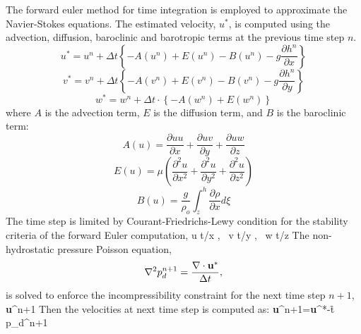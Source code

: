 The forward euler method for time integration is employed to
approximate the Navier-Stokes equations. The estimated velocity, $u^{*}$,
is computed using the advection, diffusion, baroclinic and barotropic terms at the previous time step $n$.
\begin {equation}
u^{*} = u^{n}+ \Delta t  \left\{
-A(u^n)+E(u^n)-B(u^n)-g\frac{\partial h^n}{\partial
x}%
\right\}
\end{equation}
\begin {equation}
v^{*} = v^{n}+ \Delta t  \left\{
-A(v^n)+E(v^n)-B(v^n)-g\frac{\partial h^n}{\partial
y}%
\right\}
\end{equation}
\begin {equation}
w^{*} = w^{n}+ \Delta t \cdot \left\{ -A(w^n)+E(w^n)\right\}
\end{equation}
where $A$ is the advection term, $E$ is the diffusion term, and $B$ is
the baroclinic term:
\begin{equation}
A(u)=\frac {\partial uu}{\partial x}+ \frac {\partial
uv}{\partial y}+ \frac {\partial uw}{\partial z}
\end{equation}
\begin{equation}
E(u)=\mu (\frac {\partial^2 u}{\partial x^2}+\frac
{\partial^2 u}{\partial y^2}+\frac {\partial^2 u}{\partial z^2})
\end{equation}
\begin{equation}
B(u)=\frac{g}{\rho_o}\int_z^h \frac{\partial \rho}{\partial x} d
\xi
\end{equation}
The time step is limited by Courant-Friedrichs-Lewy condition for the stability criteria of the forward Euler computation,
\be
u \Delta t/\Delta x , \ v \Delta t/\Delta y , \ w \Delta t/\Delta z 
\ee
The non-hydrostatic pressure Poisson equation,
\begin{equation}
\nabla^2 p_d^{n+1} = \frac {\nabla \cdot
\textbf{\textbf{u}}^*}{\Delta t},
\label{eqn:pressure-poisson-const-den}
\end{equation}
is solved to enforce the incompressibility constraint for the next time step
$n+1$,
\be
\n \cdot \textbf{u}^{n+1}
\ee
Then the velocities at next time step is computed as:
\be
\textbf{u}^{n+1}=\textbf{u}^*-\f{\Delta t}{\rho} \n p_d^{n+1}
\ee

